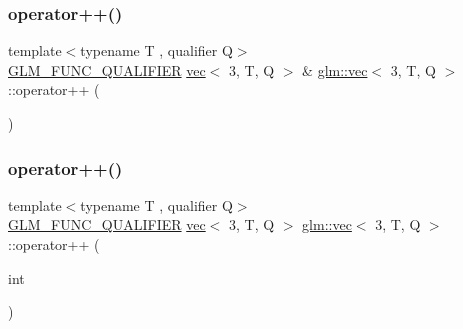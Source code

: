 \mbox{\label{structglm_1_1vec_3_013_00_01_t_00_01_q_01_4_a5815270bfae62e24ed90c95b1054cd9d}} 
\subsubsection{\texorpdfstring{operator++()}{operator++()}\hspace{0.1cm}{\footnotesize\ttfamily [1/2]}}
{\footnotesize\ttfamily template$<$typename T , qualifier Q$>$ \\
\hyperlink{setup_8hpp_a33fdea6f91c5f834105f7415e2a64407}{G\+L\+M\+\_\+\+F\+U\+N\+C\+\_\+\+Q\+U\+A\+L\+I\+F\+I\+ER} \hyperlink{structglm_1_1vec}{vec}$<$ 3, T, Q $>$ \& \hyperlink{structglm_1_1vec}{glm\+::vec}$<$ 3, T, Q $>$\+::operator++ (\begin{DoxyParamCaption}{ }\end{DoxyParamCaption})}

\mbox{\label{structglm_1_1vec_3_013_00_01_t_00_01_q_01_4_acdb71d342fb424b32ea13d9ab2fd11b8}} 
\subsubsection{\texorpdfstring{operator++()}{operator++()}\hspace{0.1cm}{\footnotesize\ttfamily [2/2]}}
{\footnotesize\ttfamily template$<$typename T , qualifier Q$>$ \\
\hyperlink{setup_8hpp_a33fdea6f91c5f834105f7415e2a64407}{G\+L\+M\+\_\+\+F\+U\+N\+C\+\_\+\+Q\+U\+A\+L\+I\+F\+I\+ER} \hyperlink{structglm_1_1vec}{vec}$<$ 3, T, Q $>$ \hyperlink{structglm_1_1vec}{glm\+::vec}$<$ 3, T, Q $>$\+::operator++ (\begin{DoxyParamCaption}\item[{int}]{ }\end{DoxyParamCaption})}

\mbox{\label{structglm_1_1vec_3_013_00_01_t_00_01_q_01_4_acb693fdeaa576d503444ee370c423cf3}} 
